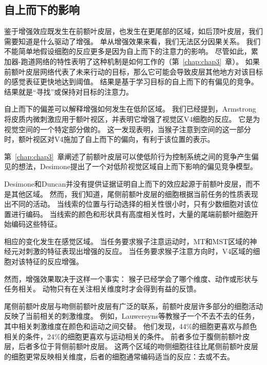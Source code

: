 \subsection{自上而下的影响}

鉴于增强效应既发生在前额叶皮层，也发生在更尾部的区域，如后顶叶皮层，我们需要知道是什么驱动了增强。
单从增强效果来看，我们无法区分因果关系。
我们不能简单地假设细胞的反应更多是因为自上而下的注意力的影响。
尽管如此，累加器-跑道网络的特性表明了这种机制是如何工作的（第~\ref{chap:chap3}~章）。
如果前额叶皮层网络代表了未来行动的目标，那么它可能会导致皮层其他地方对该目标的感觉表征更快地达到阈值。
结果是基于学习目标的自上而下的有偏见的竞争\cite{desimone1995neural}。
结果就是“寻找”或保持对目标的注意力。


自上而下的偏差可以解释增强如何发生在低阶区域。
我们已经提到，Armstrong\cite{armstrong2007rapid}将皮质内微刺激应用于额叶视区，并表明它增强了视觉区V4细胞的反应。
它是为视觉空间的一个特定部分做的。
这一发现表明，当猴子注意到空间的这一部分时，额叶视区对V4施加了自上而下的偏向，有利于该位置的表示。


第~\ref{chap:chap3}~章阐述了前额叶皮层可以使低阶行为控制系统之间的竞争产生偏见的想法，Desimone\cite{desimone1995neural}提出了一个对低阶视觉区域自上而下影响的偏见竞争模型。


Desimone和Duncan并没有提供证据证明自上而下的效应起源于前额叶皮层，而不是其他区域。
然而，我们知道，尾侧前额叶皮层的细胞根据当前任务的性质表现出不同的活动。
当线索的位置与行动选择的相关性很小时，只有少数细胞对该位置进行编码\cite{chen2001neuronal}。
当线索的颜色和形状具有高度相关性时，大量的尾端前额叶细胞开始编码这些特征\cite{bichot1996visual}。


相应的变化发生在感觉区域。
当任务要求猴子注意运动时，MT和MST区域的神经元对刺激的特征表现出增强的反应\cite{treue1996attentional}。
当任务要求猴子注意方向时，V4区域的细胞对该特征的反应增强\cite{mcadams1999effects}。


然而，增强效果取决于这样一个事实：
猴子已经学会了哪个维度、动作或形状与任务相关。
动物只有在关注相关维度时才会得到有益的反馈。


尾侧前额叶皮层与吻侧前额叶皮层有广泛的联系，前额叶皮层许多部分的细胞活动反映了当前相关的刺激维度。
例如，Lauwereyns等\cite{lauwereyns2001responses}教猴子一个不去不去的任务，其中相关刺激维度在颜色和运动之间交替。
他们发现，44\%的细胞更喜欢与颜色相关的条件，24\%的细胞更喜欢与运动相关的条件。
前者多位于腹侧前额叶皮层，后者多位于背侧前额叶皮层。
这两个区域的吻侧细胞往往比尾侧前额叶皮层的细胞更常反映相关维度，后者的细胞通常编码适当的反应：去或不去。


